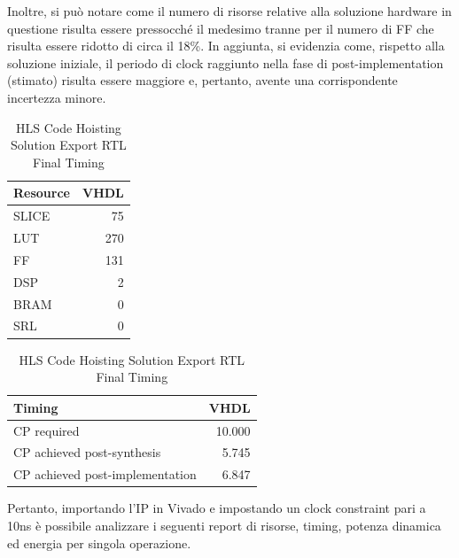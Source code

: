 Inoltre, si può notare come il numero di risorse relative alla soluzione hardware in questione risulta essere pressocché il medesimo tranne per il numero di FF che risulta essere ridotto di circa il 18\%. In aggiunta, si evidenzia come, rispetto alla soluzione iniziale, il periodo di clock raggiunto nella fase di post-implementation (stimato) risulta essere maggiore e, pertanto, avente una corrispondente incertezza minore.

\begin{table}[H]
    \centering
    \begin{minipage}[t]{0.45\linewidth}
        \centering
        \begin{tabular}{|l|r|}
            \hline
            \textbf{Resource} & \textbf{VHDL} \\
            \hline
            SLICE & 75 \\
            \hline
            LUT & 270 \\
            \hline
            FF & 131 \\
            \hline
            DSP & 2 \\
            \hline
            BRAM & 0 \\
            \hline
            SRL & 0 \\
            \hline
        \end{tabular}
        \caption{HLS Code Hoisting Solution Export RTL Resource Usage}
        \label{tab:hls-code-hoisting-solution-export-rtl-resoruce-usage}
    \end{minipage}
    \hfill
    \begin{minipage}[t]{0.45\linewidth}
        \centering
        \begin{tabular}{|l|r|}
            \hline
            \textbf{Timing} & \textbf{VHDL} \\
            \hline
            CP required & 10.000 \\
            \hline
            CP achieved post-synthesis & 5.745 \\
            \hline
            CP achieved post-implementation & 6.847 \\
            \hline
        \end{tabular}
        \caption{HLS Code Hoisting Solution Export RTL Final Timing}
        \label{tab:hls-code-hoisting-solution-export-rtl-final-timing}
    \end{minipage}
\end{table}

Pertanto, importando l'IP in Vivado e impostando un clock constraint pari a 10ns è possibile analizzare i seguenti report di risorse, timing, potenza dinamica ed energia per singola operazione.


